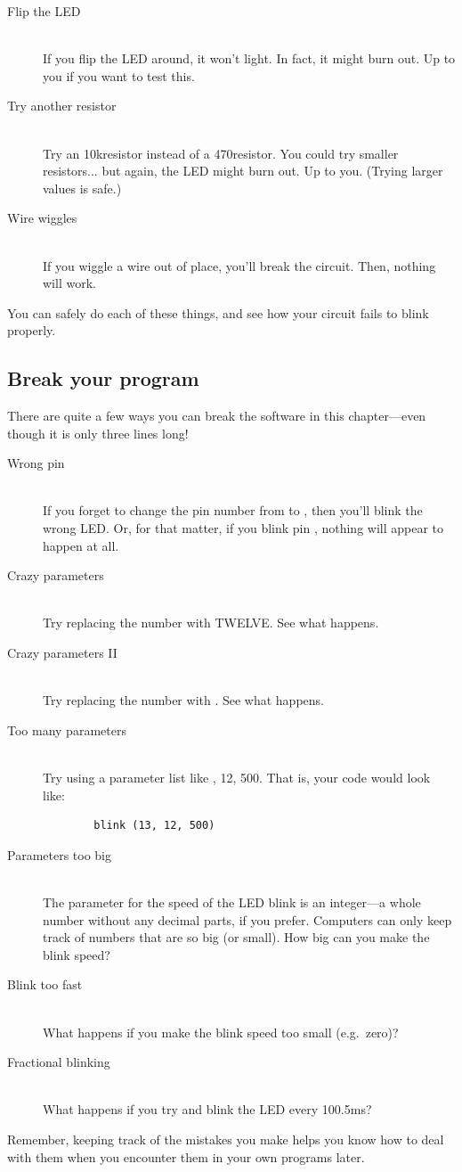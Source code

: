 \begin{description}
	\item[Flip the LED]\ \\ 
	If you flip the LED around, it won't light. In fact, it might burn out. Up to you if you want to test this.
	\item[Try another resistor]\ \\
	Try an 10k\ohm resistor instead of a 470\ohm resistor. You could try smaller resistors... but again, the LED might burn out. Up to you. (Trying larger values is safe.)
	\item[Wire wiggles]\ \\
	If you wiggle a wire out of place, you'll break the circuit. Then, nothing will work.
\end{description}

You can safely do each of these things, and see how your circuit fails to blink properly.

\subsection{Break your program}
There are quite a few ways you can break the software in this chapter---even though it is only three lines long!

\begin{description}
	\item[Wrong pin]\ \\
		If you forget to change the pin number from {} to {}, then you'll blink the wrong LED. Or, for that matter, if you blink pin {}, nothing will appear to happen at all.
	\item[Crazy parameters]\ \\
	Try replacing the number {} with {\code TWELVE}. See what happens. 
	
	\newpage
	
	\item[Crazy parameters II]\ \\
	Try replacing the number {} with {}. See what happens.
	\item[Too many parameters]\ \\
	Try using a parameter list like {, 12, 500}. That is, your code would look like:
	\begin{verbatim}
		blink (13, 12, 500)
	\end{verbatim}
	\item[Parameters too big]\ \\
	The parameter for the speed of the LED blink is an integer---a whole number without any decimal parts, if you prefer. Computers can only keep track of numbers that are so big (or small). How big can you make the blink speed? 
	\item[Blink too fast]\ \\
	What happens if you make the blink speed too small (e.g.~zero)?
	\item[Fractional blinking]\ \\
	What happens if you try and blink the LED every 100.5ms?
\end{description}

Remember, keeping track of the mistakes you make helps you know how to deal with them when you encounter them in your own programs later.


		



 


